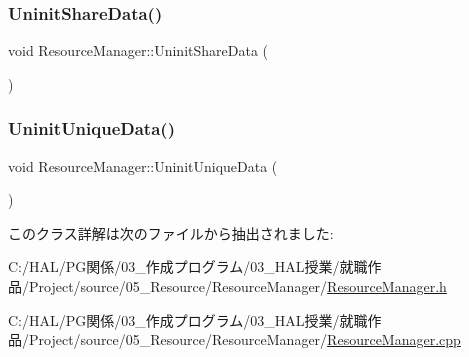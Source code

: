 \subsubsection{\texorpdfstring{Uninit\+Share\+Data()}{UninitShareData()}}
{\footnotesize\ttfamily void Resource\+Manager\+::\+Uninit\+Share\+Data (\begin{DoxyParamCaption}{ }\end{DoxyParamCaption})\hspace{0.3cm}{\ttfamily [static]}}

\mbox{\label{class_resource_manager_abcb135906cb991a49ec6e8c8db057de1}} 
\subsubsection{\texorpdfstring{Uninit\+Unique\+Data()}{UninitUniqueData()}}
{\footnotesize\ttfamily void Resource\+Manager\+::\+Uninit\+Unique\+Data (\begin{DoxyParamCaption}{ }\end{DoxyParamCaption})\hspace{0.3cm}{\ttfamily [static]}}



このクラス詳解は次のファイルから抽出されました\+:\begin{DoxyCompactItemize}
\item 
C\+:/\+H\+A\+L/\+P\+G関係/03\+\_\+作成プログラム/03\+\_\+\+H\+A\+L授業/就職作品/\+Project/source/05\+\_\+\+Resource/\+Resource\+Manager/\mbox{\hyperlink{_resource_manager_8h}{Resource\+Manager.\+h}}\item 
C\+:/\+H\+A\+L/\+P\+G関係/03\+\_\+作成プログラム/03\+\_\+\+H\+A\+L授業/就職作品/\+Project/source/05\+\_\+\+Resource/\+Resource\+Manager/\mbox{\hyperlink{_resource_manager_8cpp}{Resource\+Manager.\+cpp}}\end{DoxyCompactItemize}
